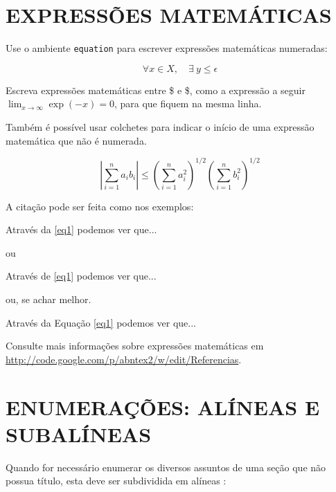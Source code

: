 \section{\uppercase{Expressões matemáticas}}

Use o ambiente \texttt{equation} para escrever
expressões matemáticas numeradas:

\begin{equation}
  \forall x \in X, \quad \exists \: y \leq \epsilon
  \label{eq1}
\end{equation}

Escreva expressões matemáticas entre \$ e \$, como a expressão a seguir $ \lim_{x \to \infty} \exp(-x) = 0 $, para que fiquem na mesma linha.

Também é possível usar colchetes para indicar o início de uma expressão
matemática que não é numerada.

\[
\left|\sum_{i=1}^n a_ib_i\right|
\le
\left(\sum_{i=1}^n a_i^2\right)^{1/2}
\left(\sum_{i=1}^n b_i^2\right)^{1/2}
\]

A citação pode ser feita como nos exemplos:

Através da \autoref{eq1} podemos ver que...

ou

Através de \eqref{eq1} podemos ver que...

ou, se achar melhor.

Através da Equação \eqref{eq1} podemos ver que...

Consulte mais informações sobre expressões matemáticas em
\url{http://code.google.com/p/abntex2/w/edit/Referencias}.

\section{\uppercase{Enumerações: alíneas e subalíneas}}

Quando for necessário enumerar
os diversos assuntos de uma seção que não possua título, esta deve ser
subdividida em alíneas \cite[4.2]{NBR6024:2012}:

